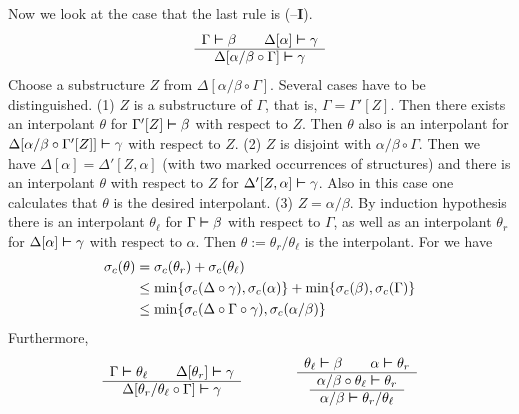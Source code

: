 Now we look at the case that the last rule is ({\mtt{\tf}}--\textbf{I}).
\begin{equation}
\begin{array}{c}
\Gamma \boldsymbol{\vdash} \beta \qquad \Delta[\alpha] \boldsymbol{\vdash} \gamma \\\hline
\Delta[\alpha/\beta \circ \Gamma] \boldsymbol{\vdash} \gamma
\end{array}
\end{equation}
Choose a substructure $Z$ from $\Delta[\alpha/\beta \circ \Gamma]$.
Several cases have to be distinguished.
(1) $Z$ is a substructure of $\Gamma$, that is, $\Gamma =
\Gamma'[Z]$. Then there exists an interpolant $\theta$ for
$\Gamma'[Z] \boldsymbol{\vdash} \beta$ with respect to $Z$. Then
$\theta$ also is an interpolant for $\Delta[\alpha/\beta
\circ \Gamma'[Z]] \boldsymbol{\vdash} \gamma$ with respect to $Z$.
(2) $Z$ is disjoint with $\alpha/\beta \circ \Gamma$. Then 
we have $\Delta[\alpha] = \Delta'[Z, \alpha]$ (with two marked 
occurrences of structures) and there is an interpolant $\theta$ 
with respect to $Z$ for $\Delta'[Z,\alpha]
\boldsymbol{\vdash} \gamma$. Also in this case one calculates that
$\theta$ is the desired interpolant. (3) $Z = \alpha/\beta$.
By induction hypothesis there is an interpolant $\theta_{\ell}$
for $\Gamma \boldsymbol{\vdash} \beta$ with respect to $\Gamma$, as well as
an interpolant $\theta_r$ for $\Delta[\alpha] \boldsymbol{\vdash}
\gamma$ with respect to $\alpha$. Then $\theta := \theta_r/\theta_{\ell}$
is the interpolant. For we have
\begin{align}
\sigma_c(\theta) & = \sigma_c(\theta_r) + \sigma_c(\theta_{\ell}) \\\notag
                 & \leq 
	\min\{\sigma_c(\Delta \circ \gamma),\sigma_c(\alpha)\} +
\min\{\sigma_c(\beta), \sigma_c(\Gamma)\} \\\notag
                 & \leq 
\min\{\sigma_c(\Delta \circ \Gamma \circ \gamma),
\sigma_c(\alpha/\beta)\}
\end{align}
Furthermore,
\begin{equation}
\begin{array}{c}
\Gamma \boldsymbol{\vdash} \theta_{\ell} \qquad \Delta[\theta_r] \boldsymbol{\vdash} \gamma
\\\hline
\Delta[\theta_r/\theta_{\ell} \circ \Gamma] \boldsymbol{\vdash} \gamma
\end{array}\qquad\qquad
\begin{array}{c}
\theta_{\ell} \boldsymbol{\vdash} \beta \qquad \alpha \boldsymbol{\vdash} \theta_r \\\hline
\begin{array}{c}
\alpha/\beta \circ \theta_{\ell} \boldsymbol{\vdash} \theta_r \\\hline
\alpha/\beta \boldsymbol{\vdash} \theta_r / \theta_{\ell}
\end{array}
\end{array}
\end{equation}
